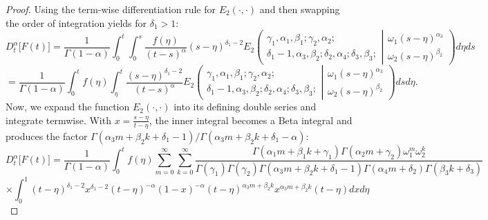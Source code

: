 \documentclass{amsart}
\numberwithin{equation}{section}
\begin{document}
\begin{proof}
Using the term-wise differentiation rule for $E_2(\cdot,\cdot)$ and then swapping the order of integration yields for $\delta_1>1$:
\begin{equation*}
     D_t^\alpha\big[F(t)\big]=\frac{1}{\Gamma(1-\alpha)}\int_0^t \int_0^s \frac{f(\eta)}{(t-s)^\alpha}(s-\eta)^{\delta_1-2 }E_2\left(\begin{array}{c}
\gamma_1,\alpha_1, \beta_1 ; \gamma_2, \alpha_2 ; \\
\delta_1-1, \alpha_3, \beta_2 ;\delta_2, \alpha_4; \delta_3, \beta_3 ; 
\end{array} \left| 
\begin{array}{c}
\omega_1 (s-\eta)^{\alpha_3} \\
\omega_2 (s-\eta)^{\beta_2} 
\end{array} 
\right.
\right)d\eta ds
\end{equation*}
\begin{equation*}
 =\frac{1}{\Gamma(1-\alpha)}\int_0^t f(\eta) \int_\eta^t \frac{(s-\eta)^{\delta_1-2}}{(t-s)^\alpha} E_2\left(\begin{array}{c}
\gamma_1,\alpha_1, \beta_1 ; \gamma_2, \alpha_2 ; \\
\delta_1-1, \alpha_3, \beta_2 ;\delta_2, \alpha_4; \delta_3, \beta_3 ; 
\end{array} \left| 
\begin{array}{c}
\omega_1 (s-\eta)^{\alpha_3} \\
\omega_2 (s-\eta)^{\beta_2} 
\end{array} 
\right.
\right)ds d\eta. 
\end{equation*}
Now, we expand  the function $E_2(\cdot,\cdot)$ into its defining double series and integrate termwise. With
$x=\frac{s-\eta}{t-\eta}$, the inner integral becomes a Beta integral and produces the factor
$\Gamma(\alpha_3 m+\beta_2 k+\delta_1-1)/\Gamma(\alpha_3 m+\beta_2 k+\delta_1-\alpha)$:
\begin{equation*}
    D_t^\alpha\big[F(t)\big]=\frac{1}{\Gamma(1-\alpha)} \int_0^t f(\eta) \sum_{m=0}^\infty \sum_{k=0}^\infty \frac{\Gamma(\alpha_1 m+\beta_1 k+\gamma_1)\Gamma(\alpha_2 m+\gamma_2) \omega_1^m \omega_2^k}{\Gamma(\gamma_1)\Gamma(\gamma_2)\Gamma(\alpha_3 m+\beta_2 k+\delta_1-1)\Gamma(\alpha_4 m+\delta_2)\Gamma(\beta_3 k+ \delta_3)}
\end{equation*}
\begin{equation*}
    \times\int_0^1 (t-\eta)^{\delta_1-2} x^{\delta_1-2} (t-\eta)^{-\alpha}(1-x)^{-\alpha}(t-\eta)^{\alpha_3 m+\beta_2 k}x^{\alpha_3 m+\beta_2 k} (t-\eta) dx d\eta
\end{equation*}


\end{proof}
\end{document}
